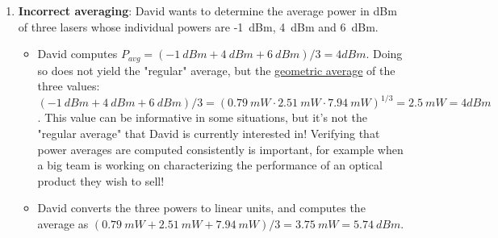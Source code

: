 \begin{enumerate}
    \item \textbf{Incorrect averaging}: David wants to determine the average power in dBm of three lasers whose individual powers are -1~dBm, 4~dBm and 6~dBm.     
    \begin{itemize}
    \item[\redcross] David computes $P_{avg}=(-1~dBm+4~dBm+6~dBm)/3=4dBm$. Doing so does not yield the "regular" average, but the \href{https://en.wikipedia.org/wiki/Geometric_mean}{geometric average} of the three values: $(-1~dBm+4~dBm+6~dBm)/3 = (0.79~mW\cdot2.51~mW\cdot7.94~mW)^{1/3}=2.5~mW = 4dBm$. This value can be informative in some situations, but it's not the "regular average" that David is currently interested in! Verifying that power averages are computed consistently is important, for example when a big team is working on characterizing the performance of an optical product they wish to sell!  
    \item[\greencheck] David converts the three powers to linear units, and computes the average as $(0.79~mW+2.51~mW+7.94~mW)/3=3.75~mW=5.74~dBm$.  
    \end{itemize}
    
 
    
\end{enumerate}



